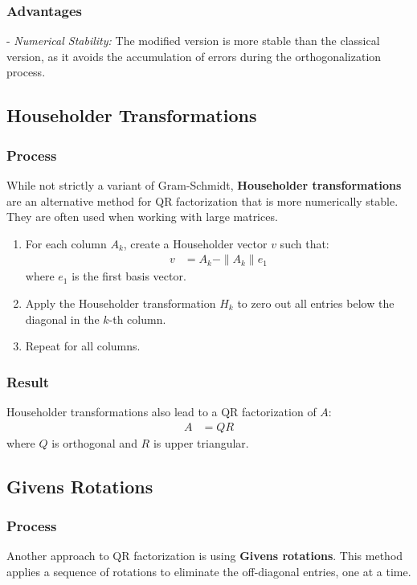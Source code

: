 \documentclass[article]{IEEEtran}
\numberwithin{equation}{enumi}
\numberwithin{figure}{enumi}
\begin{document}
\subsubsection{Advantages}
- \textit{Numerical Stability:} The modified version is more stable than the classical version, as it avoids the accumulation of errors during the orthogonalization process.

\subsection{Householder Transformations}

\subsubsection{Process}
While not strictly a variant of Gram-Schmidt, \textbf{Householder transformations} are an alternative method for QR factorization that is more numerically stable. They are often used when working with large matrices.

\begin{enumerate}
    \item For each column $ A_k $, create a Householder vector $ v $ such that:
    \begin{align*}
    v &= A_k - \|A_k\| e_1
    \end{align*}
    where $ e_1 $ is the first basis vector.
    \item Apply the Householder transformation $ H_k $ to zero out all entries below the diagonal in the $ k $-th column.
    \item Repeat for all columns.
\end{enumerate}

\subsubsection{Result}
Householder transformations also lead to a QR factorization of $ A $:
\begin{align*}
A &= QR
\end{align*}
where $ Q $ is orthogonal and $ R $ is upper triangular.

\subsection{Givens Rotations}

\subsubsection{Process}
Another approach to QR factorization is using \textbf{Givens rotations}. This method applies a sequence of rotations to eliminate the off-diagonal entries, one at a time.
\end{document}
